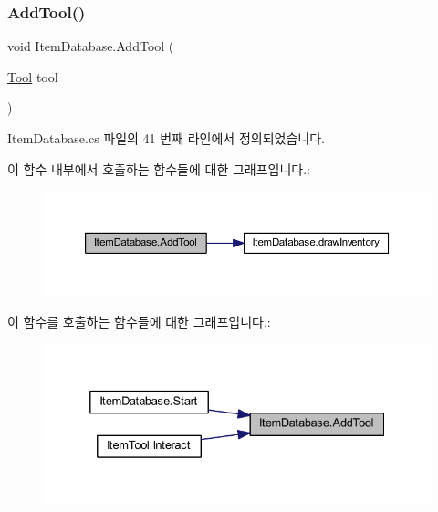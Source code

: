 \subsubsection{\texorpdfstring{AddTool()}{AddTool()}}
{\footnotesize\ttfamily void Item\+Database.\+Add\+Tool (\begin{DoxyParamCaption}\item[{\mbox{\hyperlink{class_tool}{Tool}}}]{tool }\end{DoxyParamCaption})}



Item\+Database.\+cs 파일의 41 번째 라인에서 정의되었습니다.


\begin{DoxyCode}{0}

\end{DoxyCode}
이 함수 내부에서 호출하는 함수들에 대한 그래프입니다.\+:\nopagebreak
\begin{figure}[H]
\begin{center}
\leavevmode
\includegraphics[width=350pt]{d0/dc6/class_item_database_a7e3a74f7eb19ce5f1e9015945668afb3_cgraph}
\end{center}
\end{figure}
이 함수를 호출하는 함수들에 대한 그래프입니다.\+:\nopagebreak
\begin{figure}[H]
\begin{center}
\leavevmode
\includegraphics[width=332pt]{d0/dc6/class_item_database_a7e3a74f7eb19ce5f1e9015945668afb3_icgraph}
\end{center}
\end{figure}
\mbox{\label{class_item_database_a972de3b38a572cf25163d0834c68430c}} 
